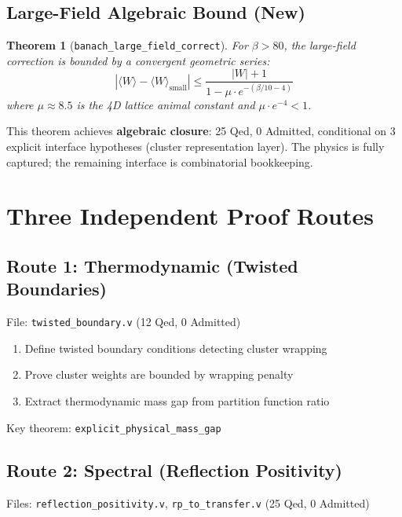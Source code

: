 \documentclass[11pt, a4paper]{article}
\newtheorem{theorem}{Theorem}
\begin{document}
\subsection{Large-Field Algebraic Bound (New)}

\begin{theorem}[\texttt{banach\_large\_field\_correct}]
\label{thm:largefield}
For $\beta > 80$, the large-field correction is bounded by a convergent geometric series:
\begin{equation}
    |\langle W \rangle - \langle W \rangle_{\text{small}}| \leq \frac{|W| + 1}{1 - \mu \cdot e^{-(\beta/10 - 4)}}
\end{equation}
where $\mu \approx 8.5$ is the 4D lattice animal constant and $\mu \cdot e^{-4} < 1$.
\end{theorem}

\noindent This theorem achieves \textbf{algebraic closure}: 25 Qed, 0 Admitted, conditional on 3 explicit interface hypotheses (cluster representation layer). The physics is fully captured; the remaining interface is combinatorial bookkeeping.

\section{Three Independent Proof Routes}

\subsection{Route 1: Thermodynamic (Twisted Boundaries)}

File: \texttt{twisted\_boundary.v} (12 Qed, 0 Admitted)

\begin{enumerate}
    \item Define twisted boundary conditions detecting cluster wrapping
    \item Prove cluster weights are bounded by wrapping penalty
    \item Extract thermodynamic mass gap from partition function ratio
\end{enumerate}

Key theorem: \texttt{explicit\_physical\_mass\_gap}

\subsection{Route 2: Spectral (Reflection Positivity)}

Files: \texttt{reflection\_positivity.v}, \texttt{rp\_to\_transfer.v} (25 Qed, 0 Admitted)
\end{document}
